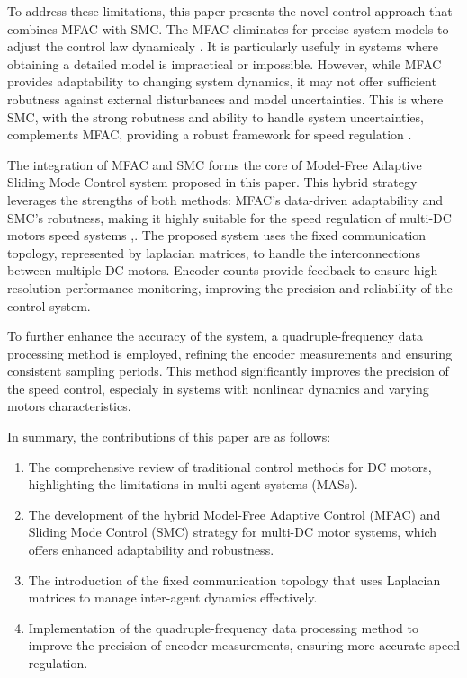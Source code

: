 \documentclass[journal,onecolumn]{IEEEtran}
\begin{document}
To address these limitations, this paper presents the novel control approach that combines MFAC with SMC. The MFAC eliminates for precise system models to adjust the control law dynamicaly \cite{8}. It is particularly usefuly in systems where obtaining a detailed model is impractical or impossible. However, while MFAC provides adaptability to changing system dynamics, it may not offer sufficient robutness against external disturbances and model uncertainties. This is where SMC, with the strong robutness and ability to handle system uncertainties, complements MFAC, providing a robust framework for speed regulation \cite{14}.

The integration of MFAC and SMC forms the core of Model-Free Adaptive Sliding Mode Control system proposed in this paper. This hybrid strategy leverages the strengths of both methods: MFAC's data-driven adaptability and SMC's robutness, making it highly suitable for the speed regulation of multi-DC motors speed systems \cite{15},\cite{16}. The proposed system uses the fixed communication topology, represented by laplacian matrices, to handle the interconnections between multiple DC motors. Encoder counts provide feedback to ensure high-resolution performance monitoring, improving the precision and reliability of the control system.

To further enhance the accuracy of the system, a quadruple-frequency data processing method is employed, refining the encoder measurements and ensuring consistent sampling periods. This method significantly improves the precision of the speed control, especialy in systems with nonlinear dynamics and varying motors characteristics.

In summary, the contributions of this paper are as follows:
\begin{enumerate}
    \item The comprehensive review of traditional control methods for DC motors, highlighting the limitations in multi-agent systems (MASs).
    
    \item The development of the hybrid Model-Free Adaptive Control (MFAC) and Sliding Mode Control (SMC) strategy for multi-DC motor systems, which offers enhanced adaptability and robustness.
    
    \item The introduction of the fixed communication topology that uses Laplacian matrices to manage inter-agent dynamics effectively.
    
    \item Implementation of the quadruple-frequency data processing method to improve the precision of encoder measurements, ensuring more accurate speed regulation.
\end{enumerate}
\end{document}

